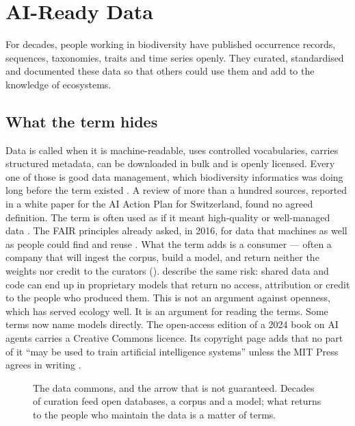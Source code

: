 \chapter{AI-Ready Data}
\label{ch:aireadydata}

For decades, people working in biodiversity have published occurrence records,
sequences, taxonomies, traits and time series openly. They curated, standardised
and documented these data so that others could use them and add to the
knowledge of ecosystems.

\section{What the term hides}

Data is called  when it is machine-readable, uses controlled
vocabularies, carries structured metadata, can be downloaded in bulk and is
openly licensed. Every one of those is good data management, which
biodiversity informatics was doing long before the term existed
\parencite{gadelha2021survey,stahlman2026longtail}. A review of more than a
hundred sources, reported in a white paper for the AI Action Plan for
Switzerland, found no agreed definition. The term is often used as if it meant
high-quality or well-managed data \parencite{legner2026aireadydata}. The FAIR
principles already asked, in 2016, for data that machines as well as people could
find and reuse \parencite{wilkinson2016fair}. What the term
adds is a consumer --- often a company that will ingest the corpus, build a
model, and return neither the weights nor credit to the curators
().
\textcite{torresani2026opening} describe the same risk: shared data and code can
end up in proprietary models that return no access, attribution or credit to
the people who produced them. This is not an
argument against openness, which has served ecology well. It is an argument for
reading the terms. Some terms now name models directly. The open-access edition
of a 2024 book on AI agents carries a Creative Commons licence. Its
copyright page adds that no part of it ``may be used to train artificial
intelligence systems'' unless the MIT Press agrees in writing
\parencite{mcshane2024agents}.

\begin{figure}[htbp]
\centering
{}
\caption{The data commons, and the arrow that is not guaranteed. Decades of
curation feed open databases, a corpus and a model; what returns to the people
who maintain the data is a matter of terms.}
\label{fig:commons}
\end{figure}

